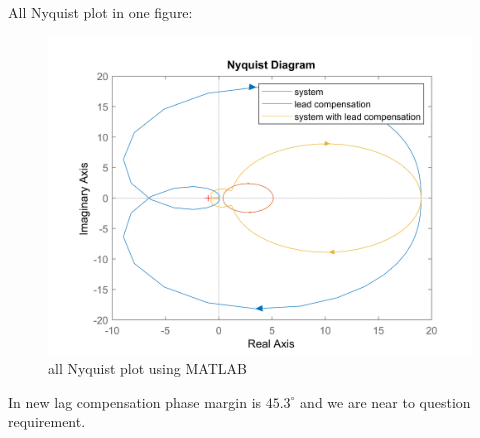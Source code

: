 All Nyquist plot in one figure:
\begin{figure}[H]
	\caption{all Nyquist plot using MATLAB}
	\centering
	\includegraphics[width=12cm]{../Figure/Q1/b/new_all_in_one_nyquist.png}
\end{figure}
In new lag compensation phase margin is $45.3^{\circ}$ and we are near to question requirement.